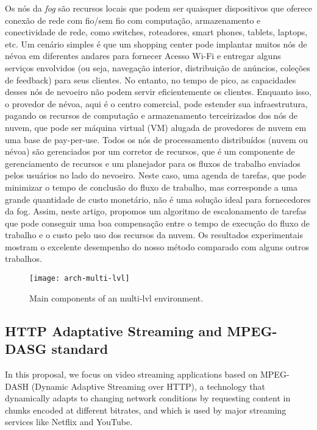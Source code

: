 Os nós da \textit{fog} são recursos locais que podem ser quaisquer dispositivos que oferece conexão de rede com fio/sem fio com computação, armazenamento e conectividade de rede, como switches, roteadores, smart phones, tablets, laptops, etc. Um cenário simples é que um shopping center pode implantar muitos nós de névoa em diferentes andares para fornecer Acesso Wi-Fi e entregar alguns serviços envolvidos (ou seja, navegação interior, distribuição de anúncios, coleções de feedback) para seus clientes. No entanto, no tempo de pico, as capacidades desses nós de nevoeiro não podem servir eficientemente os clientes. Enquanto isso, o provedor de névoa, aqui é o centro comercial, pode estender sua infraestrutura, pagando os recursos de computação e armazenamento terceirizados dos nós de nuvem, que pode ser máquina virtual (VM) alugada de provedores de nuvem em uma base de pay-per-use. Todos os nós de processamento distribuídos (nuvem ou névoa) são gerenciados por um corretor de recursos, que é um componente de gerenciamento de recursos e um planejador para os fluxos de trabalho enviados pelos usuários no lado do nevoeiro. Neste caso, uma agenda de tarefas, que pode minimizar o tempo de conclusão do fluxo de trabalho, mas corresponde a uma grande quantidade de custo monetário, não é uma solução ideal para fornecedores da fog. Assim, neste artigo, propomos um algoritmo de escalonamento de tarefas que pode conseguir uma boa compensação entre o tempo de execução do fluxo de trabalho e o custo pelo uso dos recursos da nuvem. Os resultados experimentais mostram o excelente desempenho do nosso método comparado com alguns outros trabalhos.

\begin{figure}[htb]
  \centering
  \texttt{[image: arch-multi-lvl]}
  \caption{Main components of an multi-lvl environment.}
  \label{fig:ofswitch-components}
\end{figure}


\subsection{HTTP Adaptative Streaming and MPEG-DASG standard}
\label{sec:has-dash}

In this proposal, we focus on video streaming applications based on MPEG-DASH (Dynamic
Adaptive Streaming over HTTP), a technology that dynamically
adapts to changing network conditions by requesting content in
chunks encoded at different bitrates, and which is used by major
streaming services like Netflix and YouTube.

